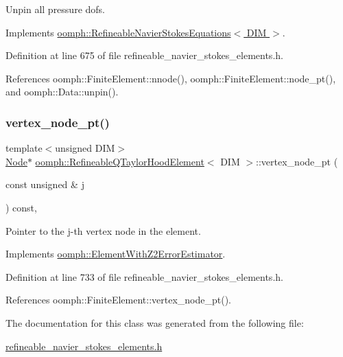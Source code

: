 Unpin all pressure dofs. 



Implements \hyperlink{classoomph_1_1RefineableNavierStokesEquations_acd0b56b66d250625401a9f6578f8bebc}{oomph\+::\+Refineable\+Navier\+Stokes\+Equations$<$ D\+I\+M $>$}.



Definition at line 675 of file refineable\+\_\+navier\+\_\+stokes\+\_\+elements.\+h.



References oomph\+::\+Finite\+Element\+::nnode(), oomph\+::\+Finite\+Element\+::node\+\_\+pt(), and oomph\+::\+Data\+::unpin().

\mbox{\label{classoomph_1_1RefineableQTaylorHoodElement_a311748123de5fa1d68c294d4b8519fbb}} 
\subsubsection{\texorpdfstring{vertex\+\_\+node\+\_\+pt()}{vertex\_node\_pt()}}
{\footnotesize\ttfamily template$<$unsigned D\+IM$>$ \\
\hyperlink{classoomph_1_1Node}{Node}$\ast$ \hyperlink{classoomph_1_1RefineableQTaylorHoodElement}{oomph\+::\+Refineable\+Q\+Taylor\+Hood\+Element}$<$ D\+IM $>$\+::vertex\+\_\+node\+\_\+pt (\begin{DoxyParamCaption}\item[{const unsigned \&}]{j }\end{DoxyParamCaption}) const\hspace{0.3cm}{\ttfamily [inline]}, {\ttfamily [virtual]}}



Pointer to the j-\/th vertex node in the element. 



Implements \hyperlink{classoomph_1_1ElementWithZ2ErrorEstimator_a0eedccc33519f852c5dc2055ddf2774b}{oomph\+::\+Element\+With\+Z2\+Error\+Estimator}.



Definition at line 733 of file refineable\+\_\+navier\+\_\+stokes\+\_\+elements.\+h.



References oomph\+::\+Finite\+Element\+::vertex\+\_\+node\+\_\+pt().



The documentation for this class was generated from the following file\+:\begin{DoxyCompactItemize}
\item 
\hyperlink{refineable__navier__stokes__elements_8h}{refineable\+\_\+navier\+\_\+stokes\+\_\+elements.\+h}\end{DoxyCompactItemize}
